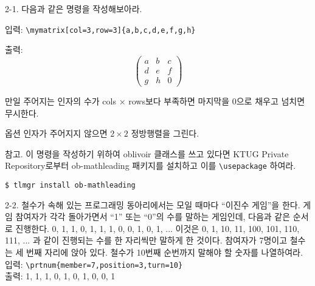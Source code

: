 \documentclass[a4paper,amsmath]{oblivoir}
\makeatletter
\let\ATonum\@onum
\makeatother
\begin{document}



\vfill


\begin{questionp}
 2-1. 다음과 같은 명령을 작성해보아라.

입력: \verb|\mymatrix[col=3,row=3]{a,b,c,d,e,f,g,h}|

출력: 
\[
\begin{pmatrix}
a & b & c \\
d & e & f \\
g & h & 0
\end{pmatrix}
\]

\ATonum 1 만일 주어지는 인자의 수가 cols $\times$ rows보다 부족하면 마지막을 $0$으로 채우고
넘치면 무시한다.

\ATonum 2 옵션 인자가 주어지지 않으면 $2\times2$ 정방행렬을 그린다.

\medskip 참고.
이 명령을 작성하기 위하여 \textsf{oblivoir} 클래스를 쓰고 있다면 
KTUG Private Repository로부터 ob-mathleading 패키지를 설치하고 이를 \verb|\usepackage| 하여라.
\begin{verbatim}
$ tlmgr install ob-mathleading
\end{verbatim}
\end{questionp}

\begin{questionp}
 2-2. 철수가 속해 있는 프로그래밍 동아리에서는 모일 때마다 “이진수 게임”을 한다.
게임 참여자가 각각 돌아가면서 “1” 또는 “0”의 수를 말하는 게임인데, 다음과 같은 순서로 진행한다.
0, 1, 1, 0, 1, 1, 1, 0, 0, 1, 0, 1, ... 이것은 0, 1, 10, 11, 100, 101, 110, 111, ... 과
같이 진행되는 수를 한 자리씩만 말하게 한 것이다.
참여자가 7명이고 철수는 세 번째 자리에 앉아 있다. 철수가 10번째 순번까지 말해야 할 숫자를 
나열하여라.
\tcblower
입력: \verb|\prtnum{member=7,position=3,turn=10}| \\
출력: 1, 1, 1, 0, 1, 0, 1, 0, 0, 1
\end{questionp}
\end{document}
